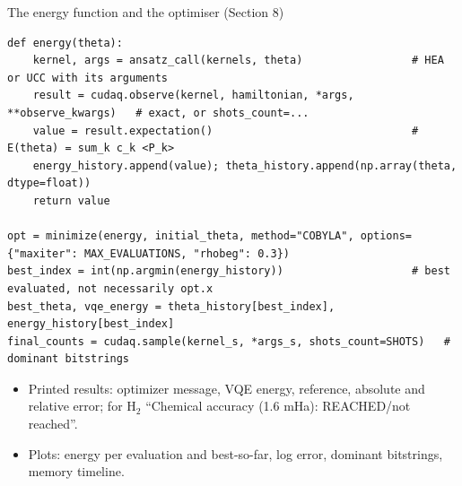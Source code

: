 \documentclass[aspectratio=169,11pt]{beamer}
\begin{document}
\begin{frame}[fragile]{The energy function and the optimiser (Section 8)}
\begin{lstlisting}[basicstyle=\ttfamily\tiny]
def energy(theta):
    kernel, args = ansatz_call(kernels, theta)                 # HEA or UCC with its arguments
    result = cudaq.observe(kernel, hamiltonian, *args, **observe_kwargs)   # exact, or shots_count=...
    value = result.expectation()                               # E(theta) = sum_k c_k <P_k>
    energy_history.append(value); theta_history.append(np.array(theta, dtype=float))
    return value

opt = minimize(energy, initial_theta, method="COBYLA", options={"maxiter": MAX_EVALUATIONS, "rhobeg": 0.3})
best_index = int(np.argmin(energy_history))                    # best evaluated, not necessarily opt.x
best_theta, vqe_energy = theta_history[best_index], energy_history[best_index]
final_counts = cudaq.sample(kernel_s, *args_s, shots_count=SHOTS)   # dominant bitstrings
\end{lstlisting}
  \begin{itemize}\small
    \item Printed results: optimizer message, VQE energy, reference, absolute and relative error; for H$_2$ ``Chemical accuracy (1.6 mHa): REACHED/not reached''.
    \item Plots: energy per evaluation and best-so-far, log error, dominant bitstrings, memory timeline.
  \end{itemize}
\end{frame}
\end{document}
